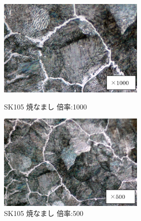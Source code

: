 \documentclass[10pt，a4j]{jsarticle}
\begin{document}
  \begin{figure}[htbp]
    \begin{minipage}{0.5\hsize}
      \begin{center}
        \includegraphics[width=7cm]{../img/SK105_yakinamashi_1000.png}
        \caption{SK105 焼なまし 倍率:1000}
      \end{center}
    \end{minipage}
    \begin{minipage}{0.5\hsize}
      \begin{center}
        \includegraphics[width=7cm]{../img/SK105_yakinamashi_500.png}
        \caption{SK105 焼なまし 倍率:500}
      \end{center}
    \end{minipage}
  \end{figure}
\end{document}
